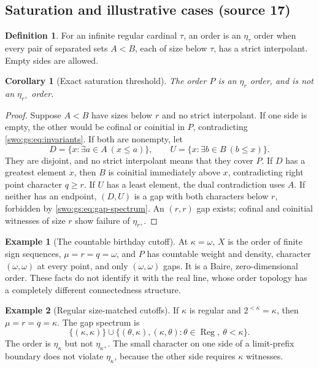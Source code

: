 \documentclass[11pt]{article}
\newtheorem{corollary}[corollary]{Corollary}
\theoremstyle{definition}
\newtheorem{definition}[definition]{Definition}
\newtheorem{example}[example]{Example}
\theoremstyle{remark}
\newcommand{\Reg}{\operatorname{Reg}}
\begin{document}
\subsection{Saturation and illustrative cases (source 17)}
\begin{definition}\label{swo:gs:n6.4}
For an infinite regular cardinal $\tau$, an order is an $\eta_\tau$ order
when every pair of separated sets $A<B$, each of size below $\tau$, has a
strict interpolant. Empty sides are allowed.
\end{definition}

\begin{corollary}[Exact saturation threshold]\label{swo:gs:cor:saturation}
The order $P$ is an $\eta_r$ order, and is not an $\eta_{r^+}$ order.
\end{corollary}
\begin{proof}
Suppose $A<B$ have sizes below $r$ and no strict interpolant. If one side
is empty, the other would be cofinal or coinitial in $P$, contradicting
\eqref{swo:gs:eq:invariants}. If both are nonempty, let
\[
 D=\{x:\exists a\in A\ (x\le a)\},\qquad
 U=\{x:\exists b\in B\ (b\le x)\}.
\]
They are disjoint, and no strict interpolant means that they cover $P$.
If $D$ has a greatest element $x$, then $B$ is coinitial immediately above
$x$, contradicting right point character $q\ge r$. If $U$ has a least
element, the dual contradiction uses $A$. If neither has an endpoint,
$(D,U)$ is a gap with both characters below $r$, forbidden by
\eqref{swo:gs:eq:gap-spectrum}.
An $(r,r)$ gap exists; cofinal and coinitial witnesses of size $r$ show
failure of $\eta_{r^+}$.
\end{proof}

\begin{example}[The countable birthday cutoff]\label{swo:gs:n6.6}
At $\kappa=\omega$, $X$ is the order of finite sign sequences,
$\mu=r=q=\omega$, and $P$ has countable weight and density, character
$(\omega,\omega)$ at every point, and only $(\omega,\omega)$ gaps.
It is a Baire, zero-dimensional order. These facts do not identify it
with the real line, whose order topology has a completely different
connectedness structure.
\end{example}

\begin{example}[Regular size-matched cutoffs]\label{swo:gs:n6.7}
If $\kappa$ is regular and $2^{<\kappa}=\kappa$, then $\mu=r=q=\kappa$.
The gap spectrum is
\[
 \{(\kappa,\kappa)\}\cup
 \{(\theta,\kappa),(\kappa,\theta):\theta\in\Reg,\ \theta<\kappa\}.
\]
The order is $\eta_\kappa$ but not $\eta_{\kappa^+}$. The small character
on one side of a limit-prefix boundary does not violate $\eta_\kappa$,
because the other side requires $\kappa$ witnesses.
\end{example}
\end{document}
